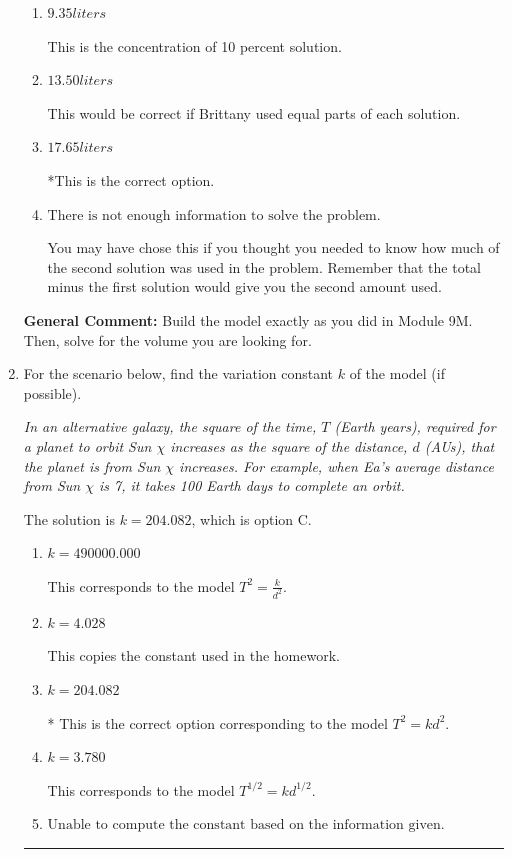 \documentclass{extbook}[14pt]
\newcommand{\litem}[1]{\item #1

\rule{\textwidth}{0.4pt}}
\begin{document}
\begin{enumerate}
{\begin{enumerate}[label=\Alph*.]
This was a random value. If this was not a guess, contact the coordinator to talk about how you got this value.
\item \( 9.35 liters \)

This is the concentration of 10 percent solution.
\item \( 13.50 liters \)

This would be correct if Brittany used equal parts of each solution.
\item \( 17.65 liters \)

*This is the correct option.
\item \( \text{There is not enough information to solve the problem.} \)

You may have chose this if you thought you needed to know how much of the second solution was used in the problem. Remember that the total minus the first solution would give you the second amount used.
\end{enumerate}

\textbf{General Comment:} Build the model exactly as you did in Module 9M. Then, solve for the volume you are looking for.
}
\litem{
For the scenario below, find the variation constant $k$ of the model (if possible).

\begin{center}
    \textit{ In an alternative galaxy, the square of the time, $T$ (Earth years), required for a planet to orbit Sun $\chi$ increases as the square of the distance, $d$ (AUs), that the planet is from Sun $\chi$ increases. For example, when Ea's average distance from Sun $\chi$ is 7, it takes 100 Earth days to complete an orbit. }
\end{center}
The solution is \( k = 204.082 \), which is option C.\begin{enumerate}[label=\Alph*.]
\item \( k = 490000.000 \)

This corresponds to the model $T^{2} = \frac{k}{d^{2}}$.
\item \( k = 4.028 \)

This copies the constant used in the homework.
\item \( k = 204.082 \)

* This is the correct option corresponding to the model $T^{2} = k d^{2}$.
\item \( k = 3.780 \)

This corresponds to the model $T^{1/2} = k d^{1/2}$.
\item \( \text{Unable to compute the constant based on the information given.} \)


\end{enumerate}}
\end{enumerate}
\end{document}
